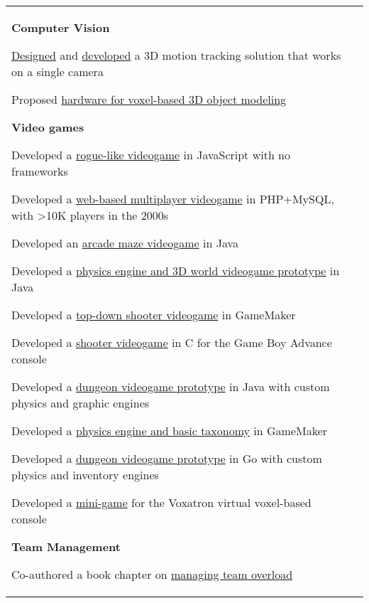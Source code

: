 \documentclass[letterpaper,10pt,oneside]{article}
\newcommand{\itemspacingtwo}{\vspace{0.08cm}}
\newenvironment{body}
{\par\par
\begin{longtable}{p{0.145\textwidth}p{0.81\textwidth}}}
{\par\end{longtable}\par}
\begin{document}
\begin{body}
\textbf{Computer Vision}
\begin{comp}
\item \href{https://www.worldscientific.com/doi/abs/10.1142/S0129065712500190}{Designed} and \href{https://github.com/lquesada/MotionTracking}{developed} a 3D motion tracking solution that works on a single camera
\item Proposed \href{https://www.tdcommons.org/dpubs_series/4167/}{hardware for voxel-based 3D object modeling}
\end{comp}
\itemspacingtwo

\textbf{Video games}
\begin{comp}
\item Developed a \href{https://cavernal.github.io/cavernal}{rogue-like videogame} in JavaScript with no frameworks
\item Developed a \href{https://github.com/lquesada/LifoSource}{web-based multiplayer videogame} in PHP+MySQL, with >10K players in the 2000s
\item Developed an \href{https://github.com/lquesada/Cocoman}{arcade maze videogame} in Java
\item Developed a \href{https://github.com/lquesada/MineWorld}{physics engine and 3D world videogame prototype} in Java
\item Developed a \href{https://github.com/lquesada/AlienZeed}{top-down shooter videogame} in GameMaker
\item Developed a \href{https://github.com/lquesada/SpaceARMy}{shooter videogame} in C for the Game Boy Advance console
\item Developed a \href{https://github.com/lquesada/RogueCave}{dungeon videogame prototype} in Java with custom physics and graphic engines
\item Developed a \href{https://github.com/lquesada/PhysicsEngine}{physics engine and basic taxonomy} in GameMaker
\item Developed a \href{https://github.com/lquesada/CaveExplorer}{dungeon videogame prototype} in Go with custom physics and inventory engines
\item Developed a \href{https://github.com/lquesada/PiticliSim}{mini-game} for the Voxatron virtual voxel-based console
\end{comp}
\itemspacingtwo

\textbf{Team Management}
\begin{comp}
\item Co-authored a book chapter on \href{https://landing.google.com/sre/workbook/chapters/overload/}{managing team overload}
\end{comp}
\itemspacingtwo


\end{body}
\end{document}

